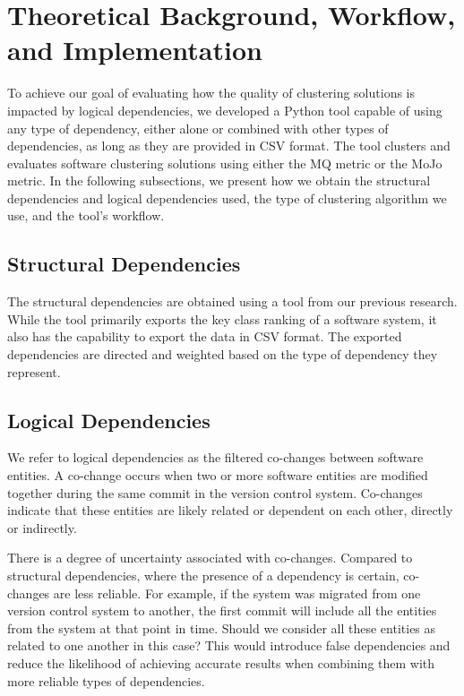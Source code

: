 \documentclass{ieeeaccess}
\begin{document}
\section{Theoretical Background, Workflow, and Implementation}
\label{sec:workflow_implementation}

To achieve our goal of evaluating how the quality of clustering solutions is impacted by logical dependencies, we developed a Python tool capable of using any type of dependency, either alone or combined with other types of dependencies, as long as they are provided in CSV format. The tool clusters and evaluates software clustering solutions using either the MQ metric or the MoJo metric. In the following subsections, we present how we obtain the structural dependencies and logical dependencies used, the type of clustering algorithm we use, and the tool's workflow.

\subsection{Structural Dependencies}
\label{subsec:sd}

The structural dependencies are obtained using a tool from our previous research. While the tool primarily exports the key class ranking of a software system, it also has the capability to export the data in CSV format. The exported dependencies are directed and weighted based on the type of dependency they represent.

\subsection{Logical Dependencies}
\label{subsec:ld}

We refer to logical dependencies as the filtered co-changes between software entities. A co-change occurs when two or more software entities are modified together during the same commit in the version control system. Co-changes indicate that these entities are likely related or dependent on each other, directly or indirectly.

There is a degree of uncertainty associated with co-changes. Compared to structural dependencies, where the presence of a dependency is certain, co-changes are less reliable. For example, if the system was migrated from one version control system to another, the first commit will include all the entities from the system at that point in time. Should we consider all these entities as related to one another in this case? This would introduce false dependencies and reduce the likelihood of achieving accurate results when combining them with more reliable types of dependencies.
\end{document}
